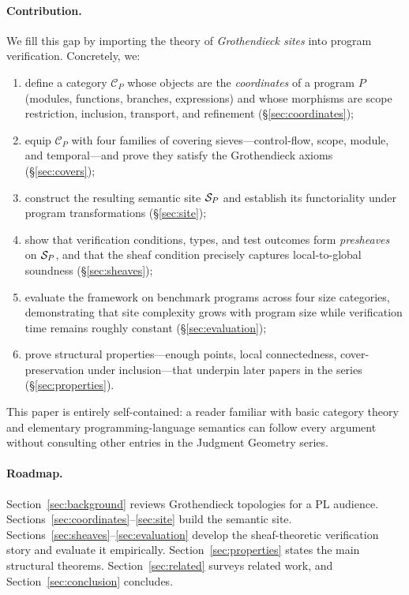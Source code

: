 \documentclass[11pt]{article}
\begin{document}
\paragraph{Contribution.}
We fill this gap by importing the theory of \emph{Grothendieck sites}
\cite{MacLaneMoerdijk1994,SGA4} into program verification.
Concretely, we:
\begin{enumerate}[label=(\roman*),nosep]
  \item define a category $\mathcal{C}_P$ whose objects are the
        \emph{coordinates} of a program $P$ (modules, functions, branches,
        expressions) and whose morphisms are scope restriction, inclusion,
        transport, and refinement (\S\ref{sec:coordinates});
  \item equip $\mathcal{C}_P$ with four families of covering sieves---control-flow,
        scope, module, and temporal---and prove they satisfy the Grothendieck
        axioms (\S\ref{sec:covers});
  \item construct the resulting semantic site $\mathcal{S}_P$ and establish its
        functoriality under program transformations (\S\ref{sec:site});
  \item show that verification conditions, types, and test outcomes form
        \emph{presheaves} on $\mathcal{S}_P$, and that the sheaf condition precisely
        captures local-to-global soundness (\S\ref{sec:sheaves});
  \item evaluate the framework on \compTotalPrograms{} benchmark programs across
        four size categories, demonstrating that site complexity grows with program
        size while verification time remains roughly constant
        (\S\ref{sec:evaluation});
  \item prove structural properties---enough points, local connectedness,
        cover-preservation under inclusion---that underpin later papers in the
        series (\S\ref{sec:properties}).
\end{enumerate}
This paper is entirely self-contained: a reader familiar with basic category
theory and elementary programming-language semantics can follow every argument
without consulting other entries in the Judgment Geometry series.

\paragraph{Roadmap.}
Section~\ref{sec:background} reviews Grothendieck topologies for a PL audience.
Sections~\ref{sec:coordinates}--\ref{sec:site} build the semantic site.
Sections~\ref{sec:sheaves}--\ref{sec:evaluation} develop the sheaf-theoretic
verification story and evaluate it empirically.
Section~\ref{sec:properties} states the main structural theorems.
Section~\ref{sec:related} surveys related work, and
Section~\ref{sec:conclusion} concludes.
\end{document}
